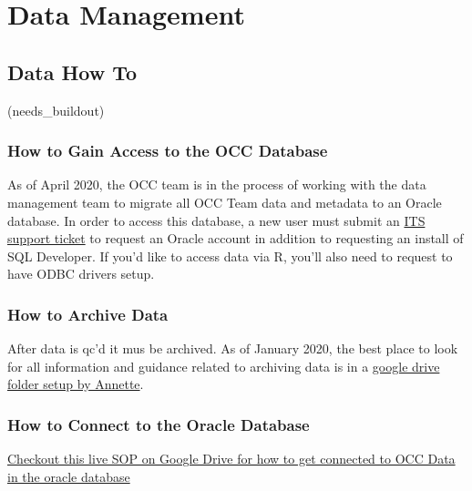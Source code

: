 \documentclass[]{book}
\begin{document}
\hypertarget{part-data-management}{%
\part*{Data Management}\label{part-data-management}}

\hypertarget{data_how_to}{%
\chapter{Data How To}\label{data_how_to}}

(needs\_buildout)

\hypertarget{how-to-gain-access-to-the-occ-database}{%
\section{How to Gain Access to the OCC Database}\label{how-to-gain-access-to-the-occ-database}}

As of April 2020, the OCC team is in the process of working with the data management team to migrate all OCC Team data and metadata to an Oracle database. In order to access this database, a new user must submit an \href{https://www.st.nmfs.noaa.gov/jira/login.jsp?permissionViolation=true\&os_destination=\%2Fbrowse\%2FPICITS-181121\%3Ffilter\%3D-2\&page_caps=\&user_role=}{ITS support ticket} to request an Oracle account in addition to requesting an install of SQL Developer. If you'd like to access data via R, you'll also need to request to have ODBC drivers setup.

\hypertarget{how-to-archive-data}{%
\section{How to Archive Data}\label{how-to-archive-data}}

After data is qc'd it mus be archived. As of January 2020, the best place to look for all information and guidance related to archiving data is in a \href{https://drive.google.com/drive/folders/1Oq76hN6eOhhJOevwZiO0nX4Gtf0tiJrp}{google drive folder setup by Annette}.

\hypertarget{how-to-connect-to-the-oracle-database}{%
\section{How to Connect to the Oracle Database}\label{how-to-connect-to-the-oracle-database}}

\href{https://docs.google.com/document/d/19hVuyRj78kB3NHR4xF-mWZeOZCwYMDNSLSwQc08Af7s/edit\#}{Checkout this live SOP on Google Drive for how to get connected to OCC Data in the oracle database}
\end{document}
